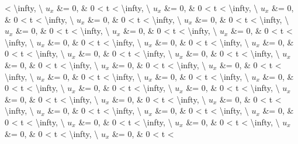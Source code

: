 \documentclass[
]{article}
\begin{document}
{{\textless{} \textbackslash infty, \textbackslash{} \(u_x\) \&= 0, \& 0
\textless{} t \textless{} \textbackslash infty, \textbackslash{} \(u_x\)
\&= 0, \& 0 \textless{} t \textless{} \textbackslash infty,
\textbackslash{} \(u_x\) \&= 0, \& 0 \textless{} t \textless{}
\textbackslash infty, \textbackslash{} \(u_x\) \&= 0, \& 0 \textless{} t
\textless{} \textbackslash infty, \textbackslash{} \(u_x\) \&= 0, \& 0
\textless{} t \textless{} \textbackslash infty, \textbackslash{} \(u_x\)
\&= 0, \& 0 \textless{} t \textless{} \textbackslash infty,
\textbackslash{} \(u_x\) \&= 0, \& 0 \textless{} t \textless{}
\textbackslash infty, \textbackslash{} \(u_x\) \&= 0, \& 0 \textless{} t
\textless{} \textbackslash infty, \textbackslash{} \(u_x\) \&= 0, \& 0
\textless{} t \textless{} \textbackslash infty, \textbackslash{} \(u_x\)
\&= 0, \& 0 \textless{} t \textless{} \textbackslash infty,
\textbackslash{} \(u_x\) \&= 0, \& 0 \textless{} t \textless{}
\textbackslash infty, \textbackslash{} \(u_x\) \&= 0, \& 0 \textless{} t
\textless{} \textbackslash infty, \textbackslash{} \(u_x\) \&= 0, \& 0
\textless{} t \textless{} \textbackslash infty, \textbackslash{} \(u_x\)
\&= 0, \& 0 \textless{} t \textless{} \textbackslash infty,
\textbackslash{} \(u_x\) \&= 0, \& 0 \textless{} t \textless{}
\textbackslash infty, \textbackslash{} \(u_x\) \&= 0, \& 0 \textless{} t
\textless{} \textbackslash infty, \textbackslash{} \(u_x\) \&= 0, \& 0
\textless{} t \textless{} \textbackslash infty, \textbackslash{} \(u_x\)
\&= 0, \& 0 \textless{} t \textless{} \textbackslash infty,
\textbackslash{} \(u_x\) \&= 0, \& 0 \textless{} t \textless{}
\textbackslash infty, \textbackslash{} \(u_x\) \&= 0, \& 0 \textless{} t
\textless{} \textbackslash infty, \textbackslash{} \(u_x\) \&= 0, \& 0
\textless{} t \textless{} \textbackslash infty, \textbackslash{} \(u_x\)
\&= 0, \& 0 \textless{} t \textless{} \textbackslash infty,
\textbackslash{} \(u_x\) \&= 0, \& 0 \textless{} t \textless{}
\textbackslash infty, \textbackslash{} \(u_x\) \&= 0, \& 0 \textless{} t
\textless{} \textbackslash infty, \textbackslash{} \(u_x\) \&= 0, \& 0
\textless{} t \textless{} \textbackslash infty, \textbackslash{} \(u_x\)
\&= 0, \& 0 \textless{} t \textless{} \textbackslash infty,
\textbackslash{} \(u_x\) \&= 0, \& 0 \textless{} t \textless{}
\textbackslash infty, \textbackslash{} \(u_x\) \&= 0, \& 0 \textless{} t
\textless{} \textbackslash infty, \textbackslash{} \(u_x\) \&= 0, \& 0
\textless{} t \textless{} \textbackslash infty, \textbackslash{} \(u_x\)
\&= 0, \& 0 \textless{} t \textless{} \textbackslash infty,
\textbackslash{} \(u_x\) \&= 0, \& 0 \textless{} t \textless{}
}}
\end{document}
